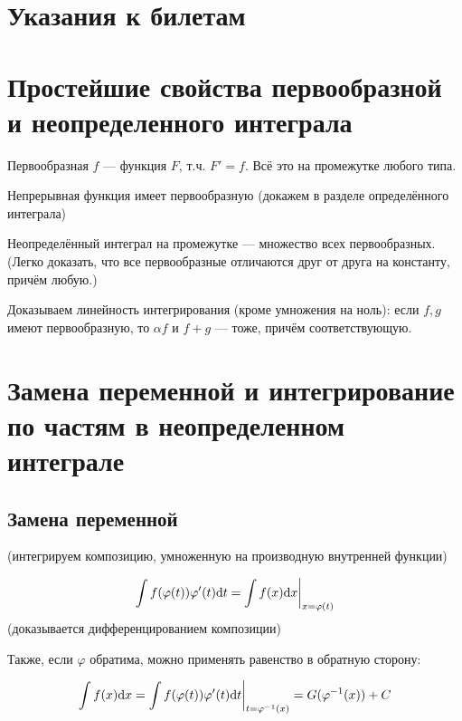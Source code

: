 \documentclass[12pt, a4paper]{article}
\begin{document}
\section{Указания к билетам}


\section{Простейшие свойства первообразной и неопределенного интеграла}

    Первообразная $f$ — функция $F$, т.ч. $F' = f$. Всё это на промежутке любого типа.


    Непрерывная функция имеет первообразную (докажем в разделе определённого интеграла)

    Неопределённый интеграл на промежутке — множество всех первообразных.
    (Легко доказать, что все первообразные отличаются друг от друга на константу, причём любую.)

    Доказываем линейность интегрирования (кроме умножения на ноль): если $f, g$ имеют первообразную, то $\alpha f$ и $f + g$ — тоже, причём соответствующую.


\section{Замена переменной и интегрирование по частям в неопределенном интеграле}

    \subsection{Замена переменной}

    (интегрируем композицию, умноженную на производную внутренней функции)

    \begin{equation}
        \int f(\varphi(t)) \varphi'(t) \mathrm{d} t = \restr{\int f(x) \mathrm{d} x}{x = \varphi(t)}
    \end{equation}
    (доказывается дифференцированием композиции)

    Также, если $\varphi$ обратима, можно применять равенство в обратную сторону:

    \begin{equation}
        \int f(x) \mathrm{d} x  = \restr{\int f(\varphi(t)) \varphi'(t) \mathrm{d} t}{t = \varphi^{-1}(x)} = G(\varphi^{-1}(x)) + C
    \end{equation}
\end{document}
